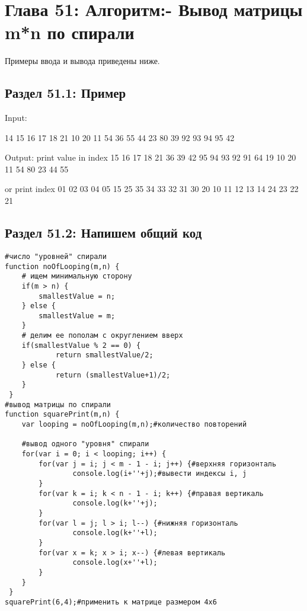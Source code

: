\chapter*{Глава 51: Алгоритм:- Вывод матрицы m*n по спирали}
Примеры ввода и вывода приведены ниже.
\section*{Раздел 51.1: Пример}
\begin{tcolorbox}
               Input:
               
\vspace{\baselineskip}
14 15 16 17 18 21 10 20 11 54 36 55 44 23 80 39 92 93 94 95 42

\vspace{\baselineskip}
Output:\newline 
print value in index 15 16 17 18 21 36 39 42 95 94 93 92 91 64 19 10 20 11 54 80 23 44 55

\vspace{\baselineskip}
or print index 01 02 03 04 05 15 25 35 34 33 32 31 30 20 10 11 12 13 14 24 23 22 21 
\end{tcolorbox}
\section*{Раздел 51.2: Напишем общий код}
\begin{tcolorbox}\begin{verbatim}
#число "уровней" спирали
function noOfLooping(m,n) {
	# ищем минимальную сторону
	if(m > n) {
		smallestValue = n;
	} else {
		smallestValue = m;
	}
	# делим ее пополам с округлением вверх
	if(smallestValue % 2 == 0) {
			return smallestValue/2;
	} else {
			return (smallestValue+1)/2;
	}
 }
#вывод матрицы по спирали
function squarePrint(m,n) {
	var looping = noOfLooping(m,n);#количество повторений

	#вывод одного "уровня" спирали
	for(var i = 0; i < looping; i++) {
		for(var j = i; j < m - 1 - i; j++) {#верхняя горизонталь
				console.log(i+''+j);#вывести индексы i, j
		}
		for(var k = i; k < n - 1 - i; k++) {#правая вертикаль
				console.log(k+''+j);
		}
		for(var l = j; l > i; l--) {#нижняя горизонталь
				console.log(k+''+l);
		}
		for(var x = k; x > i; x--) {#левая вертикаль
				console.log(x+''+l);
		}
	}
 }
squarePrint(6,4);#применить к матрице размером 4x6

\end{verbatim}
\end{tcolorbox}
